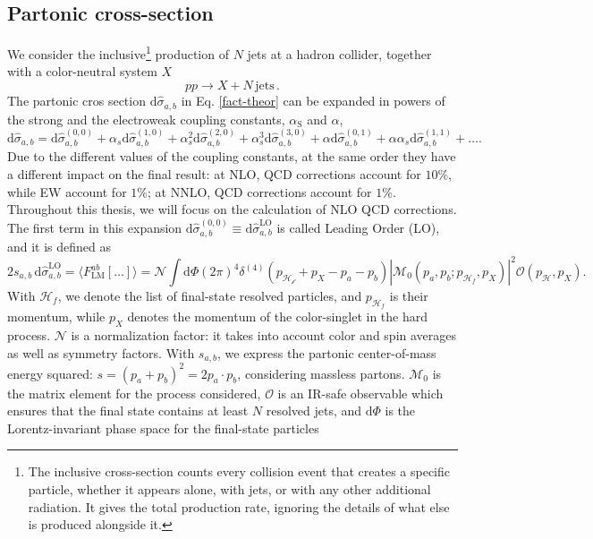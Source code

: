 \documentclass[a4paper, 12pt]{book}
\begin{document}
\subsection{Partonic cross-section}
We consider the inclusive\footnote{The inclusive cross-section counts every collision event that creates a specific particle, whether it appears alone, with jets, or with any other additional radiation. It gives the total production rate, ignoring the details of what else is produced alongside it.} production of $N$ jets at a hadron collider, together with a color-neutral system $X$
\begin{equation}
    pp \rightarrow X + N \, \mathrm{jets}  \, .
\end{equation}
The partonic cros section $\mathrm{d}\hat{\sigma}_{a,b}$ in Eq. \ref{fact-theor} can be expanded in powers of the strong and the electroweak coupling constants, $\alpha_{\text{S}}$ and $\alpha$,
\begin{equation}
    \text{d} \hat{\sigma}_{a,b} = \text{d} \hat{\sigma}_{a,b}^{(0,0)} + \alpha_s \text{d} \hat{\sigma}_{a,b}^{(1,0)} + \alpha_s^2 \text{d} \hat{\sigma}_{a,b}^{(2,0)} + \alpha_s^3 \text{d} \hat{\sigma}_{a,b}^{(3,0)} + \alpha \text{d} \hat{\sigma}_{a,b}^{(0,1)} + \alpha \alpha_s \text{d} \hat{\sigma}_{a,b}^{(1,1)} + \dots .
\end{equation}
Due to the different values of the coupling constants, at the same order they have a different impact on the final result: at NLO, QCD corrections account for $10\%$, while EW account for $1\%$; at NNLO, QCD corrections account for $1\%$. Throughout this thesis, we will focus on the calculation of NLO QCD corrections. \\
The first term in this expansion $\text{d} \hat{\sigma}_{a,b}^{(0,0)} \equiv \text{d} \hat{\sigma}_{a,b}^{\text{LO}}$ is called Leading Order (LO), and it is defined as \cite{Devoto:2025jql}
\begin{equation}
    2s_{a,b} \, \text{d} \hat{\sigma}_{a,b}^{\text{LO}} = \langle F^{ab}_{\mathrm{LM}}[\dots] \rangle = \mathcal{N} \int \mathrm{d}\Phi (2\pi)^4 \delta^{(4)}(p_\mathcal{H_f}+p_X-p_a-p_b) \left|\mathcal{M}_0(p_a,p_b;p_{\mathcal{H}_f},p_X) \right|^2 \mathcal{O}(p_\mathcal{H},p_X).
    \label{leading-order}
\end{equation}
With $\mathcal{H}_f$, we denote the list of final-state resolved particles, and $p_{\mathcal{H}_f}$ is their momentum, while $p_X$ denotes the momentum of the color-singlet in the hard process. $\mathcal{N}$ is a normalization factor: it takes into account color and spin averages as well as symmetry factors. With $s_{a,b}$, we express the partonic center-of-mass energy squared: $s=(p_a+p_b)^2=2 p_a\cdot p_b$, considering massless partons. $\mathcal{M}_0$ is the matrix element for the process considered, $\mathcal{O}$ is an IR-safe observable which ensures that the final state contains at least $N$ resolved jets, and $\mathrm{d}\Phi$ is the Lorentz-invariant phase space for the final-state particles
\end{document}
